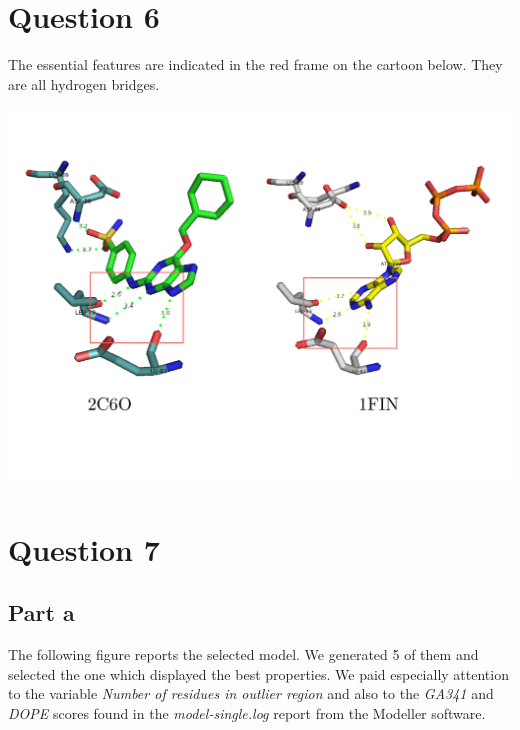 \documentclass[11pt, a4paper,titlepage]{article}
\begin{document}
\section*{Question 6}
The essential features are indicated in the red frame on the cartoon
below. They are all hydrogen bridges.

\includegraphics[width=17cm]{./Figures/6.pdf}

\section*{Question 7}
\subsection*{Part a}

The following figure reports the selected model. We generated 5 of
them and selected the one which displayed the best properties. We paid
especially attention to the variable \emph{Number of residues in
  outlier region} and also to the \emph{GA341} and \emph{DOPE} scores
found in the \emph{model-single.log} report from the Modeller
software.
\end{document}
